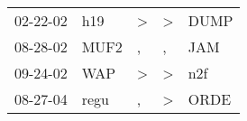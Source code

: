 \begin{supertabular}{lllll}
 02-22-02 &   h19 &  \textgreater &  \textgreater &  DUMP \\
 08-28-02 &  MUF2 &             , &             , &   JAM \\
 09-24-02 &   WAP &  \textgreater &  \textgreater &   n2f \\
 08-27-04 &  regu &             , &  \textgreater &  ORDE \\
\end{supertabular}
